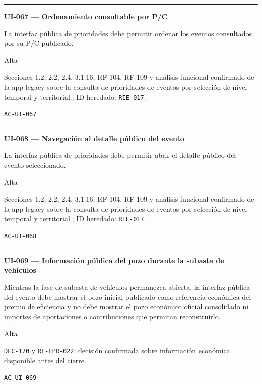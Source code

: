 \documentclass[10pt,letterpaper]{article}
\begin{document}
\vspace{0.25em}\hrule\vspace{0.65em}
\noindent\textbf{UI-067 --- Ordenamiento consultable por P/C}\par
\begin{description}[style=nextline,leftmargin=3.15cm,labelwidth=2.8cm,font=\normalfont\bfseries]
\item[Obligación] La interfaz pública de prioridades debe permitir ordenar los eventos consultados por su P/C publicado.
\item[Prioridad] Alta
\item[Procedencia] Secciones 1.2, 2.2, 2.4, 3.1.16, RF-104, RF-109 y análisis funcional confirmado de la app legacy sobre la consulta de prioridades de eventos por selección de nivel temporal y territorial.; ID heredado: \texttt{RIE-017}.
\item[Verificación] \texttt{AC-UI-067}
\end{description}
\vspace{0.25em}\hrule\vspace{0.65em}
\noindent\textbf{UI-068 --- Navegación al detalle público del evento}\par
\begin{description}[style=nextline,leftmargin=3.15cm,labelwidth=2.8cm,font=\normalfont\bfseries]
\item[Obligación] La interfaz pública de prioridades debe permitir abrir el detalle público del evento seleccionado.
\item[Prioridad] Alta
\item[Procedencia] Secciones 1.2, 2.2, 2.4, 3.1.16, RF-104, RF-109 y análisis funcional confirmado de la app legacy sobre la consulta de prioridades de eventos por selección de nivel temporal y territorial.; ID heredado: \texttt{RIE-017}.
\item[Verificación] \texttt{AC-UI-068}
\end{description}
\vspace{0.25em}\hrule\vspace{0.65em}
\noindent\textbf{UI-069 --- Información pública del pozo durante la subasta de vehículos}\par
\begin{description}[style=nextline,leftmargin=3.15cm,labelwidth=2.8cm,font=\normalfont\bfseries]
\item[Obligación] Mientras la fase de subasta de vehículos permanezca abierta, la interfaz pública del evento debe mostrar el pozo inicial publicado como referencia económica del premio de eficiencia y no debe mostrar el pozo económico oficial consolidado ni importes de aportaciones o contribuciones que permitan reconstruirlo.
\item[Prioridad] Alta
\item[Procedencia] \texttt{DEC-170} y \texttt{RF-EPR-022}; decisión confirmada sobre información económica disponible antes del cierre.
\item[Verificación] \texttt{AC-UI-069}
\end{description}
\end{document}
